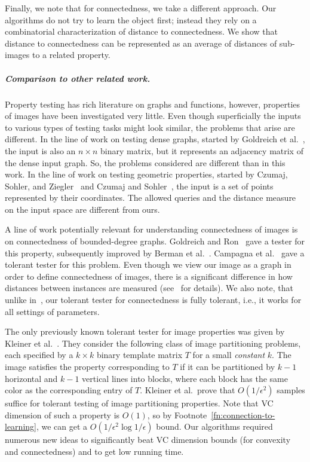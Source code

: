 \documentclass[11pt,english]{article}
\numberwithin{figure}{section}
\newcommand{\mydelta}{\epsilon} \newcommand{\bigdelta}{{\epsilon_0}} \newcommand{\dsquares}{d_{\rm squares}}
\begin{document}
Finally, we note that for connectedness, we take a different approach. Our algorithms do not try to learn the object first; instead they rely on a combinatorial characterization of distance to connectedness. We show that distance to connectedness can be represented as an average of distances of sub-images to a related property.
\subparagraph{Comparison to other related work.}
Property testing has rich literature on graphs and functions, however, properties of images have been investigated very little. Even though superficially the inputs to various types of testing tasks might look similar, the problems that arise are different.
In the line of work on testing dense graphs, started by Goldreich et al.~\cite{GGR98}, the input is also an $n\times n$ binary matrix, but it represents an adjacency matrix of the dense input graph. So, the problems considered are different than in this work.
In the line of work on testing geometric properties, started by Czumaj, Sohler, and Ziegler~\cite{CzumajSZ00} and Czumaj and Sohler~\cite{CS01}, the input is a set of points represented by their coordinates. The allowed queries and the distance measure on the input space are different from ours. 


A line of work potentially relevant for understanding connectedness of images is on connectedness of bounded-degree graphs. Goldreich and Ron~\cite{GR02}  gave a tester for this property, subsequently improved by Berman et al.~\cite{BermanRY14}. Campagna et al.~\cite{CampagnaGR13} gave a tolerant tester for this problem. Even though we view our image as a graph in order to define connectedness of images, there is a significant difference in how distances between instances are measured (see~\cite{Ras03} for details). We also note, that unlike in~\cite{CampagnaGR13}, our tolerant tester for connectedness is fully tolerant, i.e., it works for all settings of parameters.


The only previously known tolerant tester for image properties was given by Kleiner et al.~\cite{KleinerKNB11}. They consider the following class of image partitioning problems, each specified by a $k\times k$ binary template matrix $T$ for a small {\em constant} $k$. The image satisfies the property corresponding to $T$ if it can be partitioned by $k-1$ horizontal and $k-1$ vertical lines into blocks, where each block has the same color as the corresponding entry of $T$. Kleiner et al.\ prove that $O(1/\mydelta^2)$ samples suffice for tolerant testing of image partitioning properties. Note that VC dimension of such a property is $O(1)$, so by Footnote~\ref{fn:connection-to-learning}, we can get a $O(1/\mydelta^2\log 1/\mydelta)$ bound. Our algorithms required numerous new ideas to significantly beat VC dimension bounds (for convexity and connectedness) and to get low running time.
\end{document}
